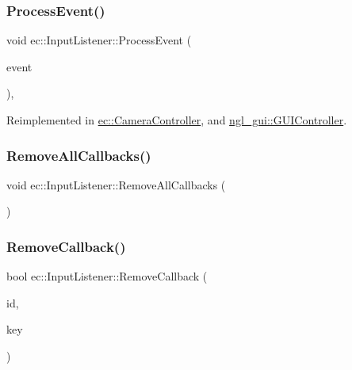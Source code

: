 \mbox{\label{classec_1_1_input_listener_a25ef07efb72ac5c880cbca876ddfe66a}} 
\subsubsection{\texorpdfstring{Process\+Event()}{ProcessEvent()}}
{\footnotesize\ttfamily void ec\+::\+Input\+Listener\+::\+Process\+Event (\begin{DoxyParamCaption}\item[{const \mbox{\hyperlink{structec_1_1_input_event}{Input\+Event}} \&}]{event }\end{DoxyParamCaption})\hspace{0.3cm}{\ttfamily [protected]}, {\ttfamily [virtual]}}



Reimplemented in \mbox{\hyperlink{classec_1_1_camera_controller_a0e2d455602581a484daf81bdb60a01bc}{ec\+::\+Camera\+Controller}}, and \mbox{\hyperlink{classngl__gui_1_1_g_u_i_controller_aa0f7e017d386e1e2f02359916be51137}{ngl\+\_\+gui\+::\+G\+U\+I\+Controller}}.

\mbox{\label{classec_1_1_input_listener_af7dd3e51508a10667973c36ef7ef48a8}} 
\subsubsection{\texorpdfstring{Remove\+All\+Callbacks()}{RemoveAllCallbacks()}}
{\footnotesize\ttfamily void ec\+::\+Input\+Listener\+::\+Remove\+All\+Callbacks (\begin{DoxyParamCaption}{ }\end{DoxyParamCaption})}

\mbox{\label{classec_1_1_input_listener_a8903c97def61ce6b9b15f36b26998883}} 
\subsubsection{\texorpdfstring{Remove\+Callback()}{RemoveCallback()}}
{\footnotesize\ttfamily bool ec\+::\+Input\+Listener\+::\+Remove\+Callback (\begin{DoxyParamCaption}\item[{const std\+::string \&}]{id,  }\item[{\mbox{\hyperlink{namespaceec_a5de6bdb8c4b2ed6e590e721ec998f964}{Event\+Key\+\_\+T}}}]{key }\end{DoxyParamCaption})}

